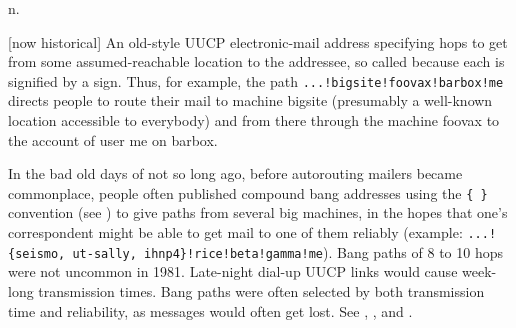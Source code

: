  n.

[now historical] An old-style UUCP electronic-mail address specifying hops to
get from some assumed-reachable location to the addressee, so called because
each  is signified by a  sign. Thus, for example,
the path \texttt{...!bigsite!foovax!barbox!me} directs people to route their
mail to machine bigsite (presumably a well-known location accessible to
everybody) and from there through the machine foovax to the account of user me
on barbox.

In the bad old days of not so long ago, before autorouting mailers became
commonplace, people often published compound bang addresses using the
\texttt{\{ \}} convention (see ) to give paths from several big
machines, in the hopes that one's correspondent might be able to get mail to one
of them reliably (example: \texttt{...!\{seismo, ut-sally,
ihnp4\}!rice!beta!gamma!me}).  Bang paths of 8 to 10 hops were not uncommon in
1981. Late-night dial-up UUCP links would cause week-long transmission times.
Bang paths were often selected by both transmission time and reliability, as
messages would often get lost. See ,
, and .

